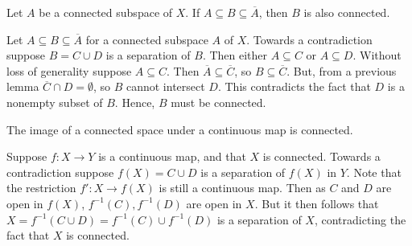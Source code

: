 \documentclass[12pt, a4paper, twoside, openright, titlepage]{book}
\begin{document}
\begin{thm}{}{}
    Let $A$ be a connected subspace of $X$. If $A \subseteq B \subseteq \overline{A}$, then $B$ is also connected.
\end{thm}
\begin{proof*}{}{}
    Let $A \subseteq B \subseteq \overline{A}$ for a connected subspace $A$ of $X$. Towards a contradiction suppose $B = C\cup D$ is a separation of $B$. Then either $A \subseteq C$ or $A \subseteq D$. Without loss of generality suppose $A \subseteq C$. Then $\overline{A} \subseteq \overline{C}$, so $B \subseteq \overline{C}$. But, from a previous lemma $\overline{C}\cap D = \emptyset$, so $B$ cannot intersect $D$. This contradicts the fact that $D$ is a nonempty subset of $B$. Hence, $B$ must be connected.
\end{proof*}


\begin{thm}{}{}
    The image of a connected space under a continuous map is connected.
\end{thm}
\begin{proof*}{}{}
    Suppose $f:X\rightarrow Y$ is a continuous map, and that $X$ is connected. Towards a contradiction suppose $f(X) = C\cup D$ is a separation of $f(X)$ in $Y$. Note that the restriction $f':X\rightarrow f(X)$ is still a continuous map. Then as $C$ and $D$ are open in $f(X)$, $f^{-1}(C),f^{-1}(D)$ are open in $X$. But it then follows that $X = f^{-1}(C\cup D) = f^{-1}(C)\cup f^{-1}(D)$ is a separation of $X$, contradicting the fact that $X$ is connected.
\end{proof*}
\end{document}
